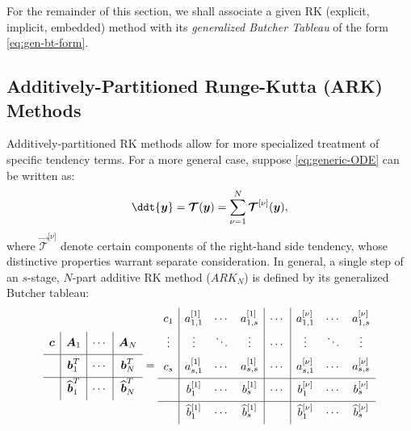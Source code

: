 \documentclass{article}
\begin{document}
For the remainder of this section, we shall associate a given RK (explicit, implicit, embedded) method with its
\emph{generalized Butcher Tableau} of the form \eqref{eq:gen-bt-form}.

\subsection{Additively-Partitioned Runge-Kutta (ARK) Methods}
Additively-partitioned RK methods allow for more specialized treatment of
specific tendency terms. For a more general case, suppose \eqref{eq:generic-ODE}
can be written as:
\begin{equation}\label{eq:additiveode}
	\ddt{\vec{y}} = \vec{\mathcal{T}}(\vec{y}) =
	\sum_{\nu = 1}^{N} \vec{\mathcal{T}}^{\lbrack \nu\rbrack}(\vec{y}),
\end{equation}
where $\vec{\mathcal{T}}^{\lbrack \nu\rbrack}$ denote certain components of the right-hand side
tendency, whose distinctive properties warrant separate consideration. In general, a single step of
an $s$-stage, $N$-part additive RK method ($ARK_N$) 
is defined by its generalized Butcher tableau:
\begin{equation}\label{eq:ARKN-BT}
\begin{array}{c|c| c | c}
\ST \vec{c} &\vec{A}_{1} & \cdots & \vec{A}_{N}\\
\hline
\ST  & \vec{b}_1^T & \cdots & \vec{b}_N^T\\
\hline
\ST  & \widehat{\vec{b}}_1^T & \cdots & \widehat{\vec{b}}_N^T
\end{array} =
\begin{array}{c|c c c | c | c c c }
\ST c_1 & a^{\lbrack 1 \rbrack}_{1,1} & \cdots & a^{\lbrack 1 \rbrack}_{1,s} & \cdots
& a^{\lbrack \nu \rbrack}_{1,1} & \cdots & a^{\lbrack \nu \rbrack}_{1,s}\\
\ST \vdots & \vdots & \ddots & \vdots & \cdots
& \vdots & \ddots & \vdots \\
\ST c_s & a^{\lbrack 1 \rbrack}_{s,1} & \cdots & a^{\lbrack 1 \rbrack}_{s,s} & \cdots
& a^{\lbrack \nu \rbrack}_{s,1} & \cdots & a^{\lbrack \nu \rbrack}_{s,s}\\
\hline
\ST  & b^{\lbrack 1 \rbrack}_1 & \cdots & b^{\lbrack 1 \rbrack}_s & \cdots
& b^{\lbrack \nu \rbrack}_1 & \cdots & b^{\lbrack \nu \rbrack}_s\\
\hline
\ST  & \widehat{b}^{\lbrack 1 \rbrack}_1 & \cdots & \widehat{b}^{\lbrack 1 \rbrack}_s &
& \widehat{b}^{\lbrack \nu \rbrack}_1 & \cdots & \widehat{b}^{\lbrack \nu \rbrack}_s
\end{array}
\end{equation}
\end{document}
